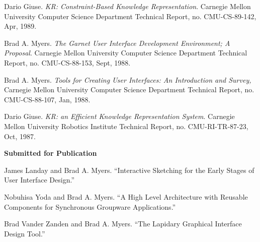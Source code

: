 Dario Giuse. {\it KR: Constraint-Based Knowledge Representation}.
Carnegie Mellon University Computer Science Department Technical Report,
no. CMU-CS-89-142, Apr, 1989.

Brad A. Myers. {\it The Garnet User Interface Development Environment; A
Proposal}.  Carnegie Mellon University Computer Science Department
Technical Report, no. CMU-CS-88-153, Sept, 1988.

Brad A. Myers. {\it Tools for Creating User Interfaces: An Introduction
and Survey,} Carnegie Mellon University Computer Science Department
Technical Report, no. CMU-CS-88-107, Jan, 1988.

Dario Giuse. {\it KR: an Efficient Knowledge Representation System}.
Carnegie Mellon University Robotics Institute Technical Report, no.
CMU-RI-TR-87-23, Oct, 1987.


{\bf Submitted for Publication}

James Landay and Brad A. Myers.  ``Interactive Sketching for the Early
Stages of User Interface Design.''

Nobuhisa Yoda and Brad A. Myers.  ``A High Level Architecture with
Reusable Components for Synchronous Groupware Applications.''

Brad Vander Zanden and Brad A. Myers.  ``The Lapidary Graphical
Interface Design Tool.''



